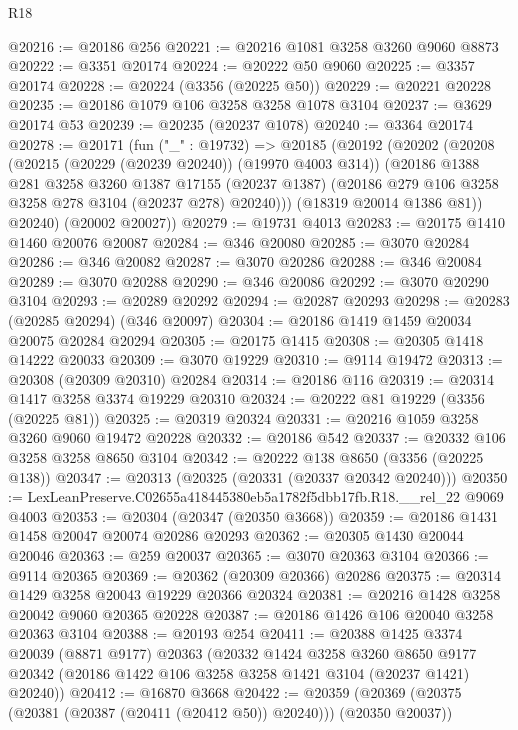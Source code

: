 \begin{lexlean}{R18}
\begin{coremodule}
@20216 := @20186 @256
@20221 := @20216 @1081 @3258 @3260 @9060 @8873
@20222 := @3351 @20174
@20224 := @20222 @50 @9060
@20225 := @3357 @20174
@20228 := @20224 (@3356 (@20225 @50))
@20229 := @20221 @20228
@20235 := @20186 @1079 @106 @3258 @3258 @1078 @3104
@20237 := @3629 @20174 @53
@20239 := @20235 (@20237 @1078)
@20240 := @3364 @20174
@20278 := @20171
    (fun ("_" : @19732) =>
    @20185
      (@20192
        (@20202
          (@20208
            (@20215 (@20229 (@20239 @20240)) (@19970 @4003 @314))
            (@20186
              @1388
              @281
              @3258
              @3260
              @1387
              @17155
              (@20237 @1387)
              (@20186 @279 @106 @3258 @3258 @278 @3104 (@20237 @278) @20240)))
          (@18319 @20014 @1386 @81))
        @20240)
      (@20002 @20027))
@20279 := @19731 @4013
@20283 := @20175 @1410 @1460 @20076 @20087
@20284 := @346 @20080
@20285 := @3070 @20284
@20286 := @346 @20082
@20287 := @3070 @20286
@20288 := @346 @20084
@20289 := @3070 @20288
@20290 := @346 @20086
@20292 := @3070 @20290 @3104
@20293 := @20289 @20292
@20294 := @20287 @20293
@20298 := @20283 (@20285 @20294) (@346 @20097)
@20304 := @20186 @1419 @1459 @20034 @20075 @20284 @20294
@20305 := @20175 @1415
@20308 := @20305 @1418 @14222 @20033
@20309 := @3070 @19229
@20310 := @9114 @19472
@20313 := @20308 (@20309 @20310) @20284
@20314 := @20186 @116
@20319 := @20314 @1417 @3258 @3374 @19229 @20310
@20324 := @20222 @81 @19229 (@3356 (@20225 @81))
@20325 := @20319 @20324
@20331 := @20216 @1059 @3258 @3260 @9060 @19472 @20228
@20332 := @20186 @542
@20337 := @20332 @106 @3258 @3258 @8650 @3104
@20342 := @20222 @138 @8650 (@3356 (@20225 @138))
@20347 := @20313 (@20325 (@20331 (@20337 @20342 @20240)))
@20350 := LexLeanPreserve.C02655a418445380eb5a1782f5dbb17fb.R18.__rel_22 @9069 @4003
@20353 := @20304 (@20347 (@20350 @3668))
@20359 := @20186 @1431 @1458 @20047 @20074 @20286 @20293
@20362 := @20305 @1430 @20044 @20046
@20363 := @259 @20037
@20365 := @3070 @20363 @3104
@20366 := @9114 @20365
@20369 := @20362 (@20309 @20366) @20286
@20375 := @20314 @1429 @3258 @20043 @19229 @20366 @20324
@20381 := @20216 @1428 @3258 @20042 @9060 @20365 @20228
@20387 := @20186 @1426 @106 @20040 @3258 @20363 @3104
@20388 := @20193 @254
@20411 := @20388
    @1425
    @3374
    @20039
    (@8871 @9177)
    @20363
    (@20332
      @1424
      @3258
      @3260
      @8650
      @9177
      @20342
      (@20186 @1422 @106 @3258 @3258 @1421 @3104 (@20237 @1421) @20240))
@20412 := @16870 @3668
@20422 := @20359 (@20369 (@20375 (@20381 (@20387 (@20411 (@20412 @50)) @20240))) (@20350 @20037))

\end{coremodule}
\end{lexlean}
